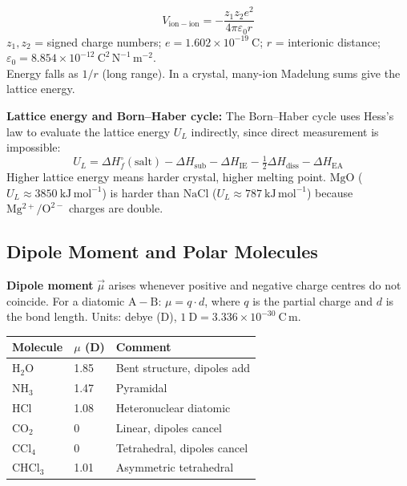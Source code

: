 \documentclass[12pt,a4paper]{article}
\begin{document}
\begin{tcolorbox}[formulabox, title={Coulomb Potential Between Two Ions}]
\[
V_{\mathrm{ion-ion}}=-\frac{z_1 z_2 e^2}{4\pi\varepsilon_0 r}
\]
$z_1, z_2$ = signed charge numbers; $e=1.602\times10^{-19}\ \mathrm{C}$; $r$ = interionic distance; $\varepsilon_0=8.854\times10^{-12}\ \mathrm{C^2\,N^{-1}\,m^{-2}}$.\\[2pt]
Energy falls as $1/r$ (long range). In a crystal, many-ion Madelung sums give the lattice energy.
\end{tcolorbox}

\textbf{Lattice energy and Born--Haber cycle:} The Born--Haber cycle uses Hess's law to evaluate the lattice energy $U_L$ indirectly, since direct measurement is impossible:
\[
U_L = \Delta H_f^\circ(\mathrm{salt}) - \Delta H_{\mathrm{sub}} - \Delta H_{\mathrm{IE}} - \tfrac12 \Delta H_{\mathrm{diss}} - \Delta H_{\mathrm{EA}}
\]
Higher lattice energy means harder crystal, higher melting point. $\mathrm{MgO}$ ($U_L\approx3850\ \mathrm{kJ\,mol^{-1}}$) is harder than $\mathrm{NaCl}$ ($U_L\approx787\ \mathrm{kJ\,mol^{-1}}$) because $\mathrm{Mg^{2+}/O^{2-}}$ charges are double.

\subsection{Dipole Moment and Polar Molecules}

\begin{tcolorbox}[defbox]
\textbf{Dipole moment} $\vec{\mu}$ arises whenever positive and negative charge centres do not coincide. For a diatomic $\mathrm{A{-}B}$: $\mu = q\cdot d$, where $q$ is the partial charge and $d$ is the bond length. Units: debye (D), $1\ \mathrm{D}=3.336\times10^{-30}\ \mathrm{C\,m}$.
\end{tcolorbox}

\begin{tabularx}{\linewidth}{|B{2.6cm}|Y|Y|}
\hline
\textbf{Molecule} & \textbf{$\mu$ (D)} & \textbf{Comment} \\
\hline
$\mathrm{H_2O}$ & 1.85 & Bent structure, dipoles add \\
\hline
$\mathrm{NH_3}$ & 1.47 & Pyramidal \\
\hline
$\mathrm{HCl}$ & 1.08 & Heteronuclear diatomic \\
\hline
$\mathrm{CO_2}$ & 0 & Linear, dipoles cancel \\
\hline
$\mathrm{CCl_4}$ & 0 & Tetrahedral, dipoles cancel \\
\hline
$\mathrm{CHCl_3}$ & 1.01 & Asymmetric tetrahedral \\
\hline
\end{tabularx}
\end{document}
